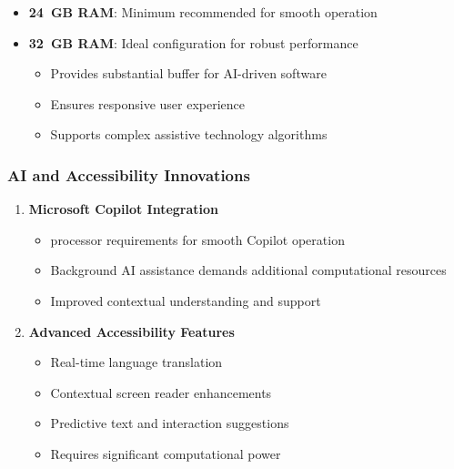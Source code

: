 \begin{itemize}
	\item \textbf{24~GB RAM}: Minimum recommended for smooth operation \supercite{EducationalEquityReport2024}
	\item \textbf{32~GB RAM}: Ideal configuration for robust performance \supercite{EducationalEquityReport2024}

	      \begin{itemize}
		      \item Provides substantial buffer for AI-driven software \supercite{AIinAccessibility}
		      \item Ensures responsive user experience \supercite{EducationalEquityReport2024}
		      \item Supports complex assistive technology algorithms \supercite{AIinAccessibility}
	      \end{itemize}

\end{itemize}



\subsubsection{AI and Accessibility Innovations}

\begin{enumerate}
	\item \textbf{Microsoft Copilot Integration}

	      \begin{itemize}
		      \item \gls{processor} requirements for smooth Copilot operation \supercite{MicrosoftCopilotRequirements}
		      \item Background AI assistance demands additional computational resources \supercite{MicrosoftCopilotTech}
		      \item Improved contextual understanding and support \supercite{MicrosoftCopilotFeatures}
	      \end{itemize}

	\item \textbf{Advanced Accessibility Features}

	      \begin{itemize}
		      \item Real-time language translation \supercite{GoogleTranslateRealtime}
		      \item Contextual screen reader enhancements \supercite{AIinAccessibility}
		      \item Predictive text and interaction suggestions \supercite{PredictiveTextAccessibility}
		      \item Requires significant computational power \supercite{AIComputationalRequirements}
	      \end{itemize}

\end{enumerate}



